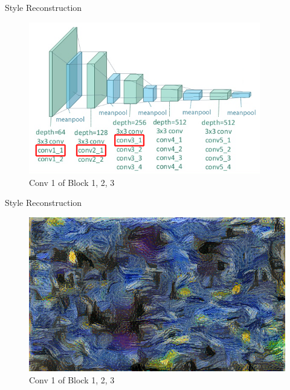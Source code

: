 \documentclass{beamer}
\begin{document}
\begin{frame}{Style Reconstruction}
\begin{figure}[ht]
\centering
\caption*{Conv 1 of Block 1, 2, 3}
\includegraphics[width=0.9\textwidth]{img/vgg19/style/block3_conv1}
\end{figure}
\end{frame}
\begin{frame}{Style Reconstruction}
\begin{figure}[ht]
\centering
\caption*{Conv 1 of Block 1, 2, 3}
\includegraphics[width=\textwidth]{img/style/block3_conv1.png}
\end{figure}
\end{frame}
\end{document}
